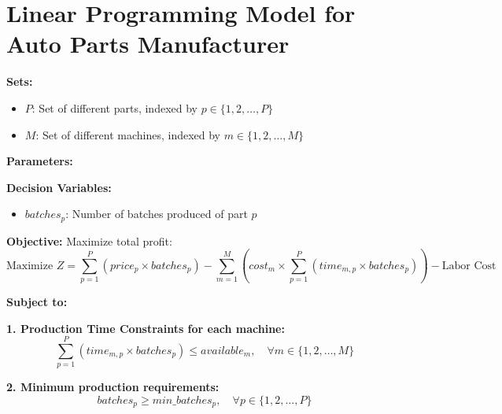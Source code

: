 \documentclass{article}
\begin{document}
\section*{Linear Programming Model for Auto Parts Manufacturer}

\textbf{Sets:}
\begin{itemize}
    \item $P$: Set of different parts, indexed by $p \in \{1, 2, \ldots, P\}$
    \item $M$: Set of different machines, indexed by $m \in \{1, 2, \ldots, M\}$
\end{itemize}

\textbf{Parameters:}

\textbf{Decision Variables:}
\begin{itemize}
    \item $batches_p$: Number of batches produced of part $p$
\end{itemize}

\textbf{Objective:}
Maximize total profit:
\[
\text{Maximize } Z = \sum_{p=1}^{P} (price_p \times batches_p) - \sum_{m=1}^{M} \left( cost_m \times \sum_{p=1}^{P} (time_{m,p} \times batches_p) \right) - \text{Labor Cost}
\]

\textbf{Subject to:}

\textbf{1. Production Time Constraints for each machine:}
\[
\sum_{p=1}^{P} (time_{m,p} \times batches_p) \leq available_m, \quad \forall m \in \{1, 2, \ldots, M\}
\]

\textbf{2. Minimum production requirements:}
\[
batches_p \geq min\_batches_p, \quad \forall p \in \{1, 2, \ldots, P\}
\]
\end{document}
